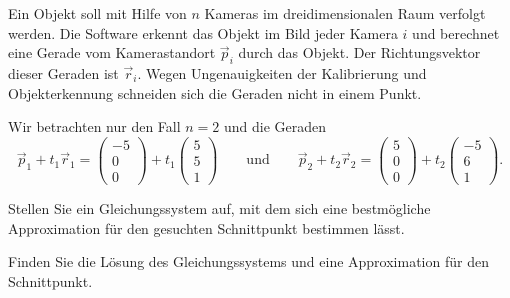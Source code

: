 Ein Objekt soll mit Hilfe von $n$ Kameras im dreidimensionalen Raum
verfolgt werden.
Die Software erkennt das Objekt im Bild jeder Kamera $i$ und berechnet
eine Gerade vom Kamerastandort $\vec p_i$ durch das Objekt.
Der Richtungsvektor dieser Geraden ist $\vec r_i$.
Wegen Ungenauigkeiten der Kalibrierung und Objekterkennung schneiden
sich die Geraden nicht in einem Punkt.

Wir betrachten nur den Fall $n=2$ und die Geraden
\[
\vec p_1+t_1\vec r_1
=
\begin{pmatrix}-5\\0\\0\end{pmatrix}
+
t_1\begin{pmatrix}5\\5\\1\end{pmatrix}
\qquad\text{und}\qquad
\vec p_2+t_2\vec r_2
=
\begin{pmatrix}5\\0\\0\end{pmatrix}
+
t_2\begin{pmatrix}-5\\6\\1\end{pmatrix}.
\]


\begin{teilaufgaben}
\item
Stellen Sie ein Gleichungssystem auf, mit dem sich eine bestmögliche
Approximation für den gesuchten Schnittpunkt bestimmen lässt.
\item
Finden Sie die Lösung des Gleichungssystems und eine Approximation für den
Schnittpunkt.
\end{teilaufgaben}

